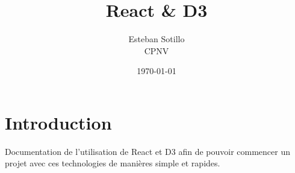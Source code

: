 \documentclass[a4paper, french, 12pt]{extarticle}
\title{React \& D3}
\author{Esteban Sotillo\\CPNV}
\date{{\small \today}}
\begin{document}
\maketitle
\section{Introduction}
Documentation de l'utilisation de React et D3 afin de pouvoir commencer un projet avec ces technologies de manières simple et rapides.
\end{document}
